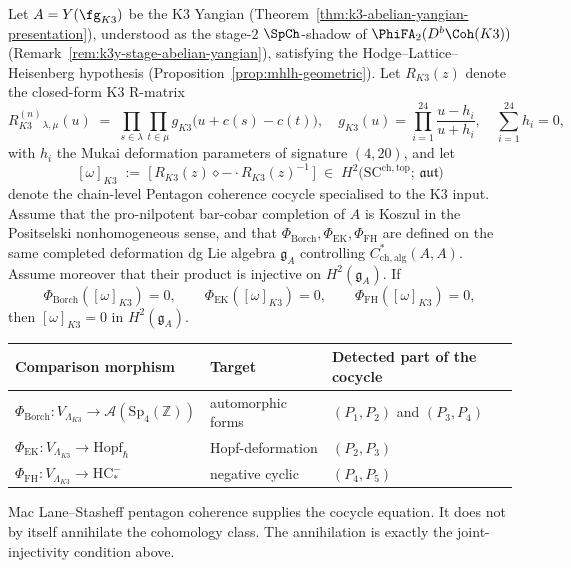\begin{theorem}
\label{thm:k3-pentagon-E1-edge-architecture}
Let $A = Y(\fg_{K3})$ be the K$3$ Yangian
\textup{(}Theorem~\ref{thm:k3-abelian-yangian-presentation}\textup{),}
understood as the stage-$2$ $\SpCh$-shadow of
$\PhiFA_2(D^b\Coh(K3))$ (Remark~\ref{rem:k3y-stage-abelian-yangian}),
satisfying the Hodge--Lattice--Heisenberg hypothesis
\textup{(}Proposition~\ref{prop:mhlh-geometric}\textup{).} Let
$R_{K3}(z)$ denote the closed-form K$3$ R-matrix
\[
 R_{K3}^{(n)}{}_{\lambda,\mu}(u)
 \;=\; \prod_{s \in \lambda}\prod_{t \in \mu}
 g_{K3}\bigl(u + c(s) - c(t)\bigr),
 \quad
 g_{K3}(u) = \prod_{i=1}^{24}\frac{u - h_i}{u + h_i},
 \quad \sum_{i=1}^{24} h_i = 0,
\]
with $h_i$ the Mukai deformation parameters of signature $(4, 20)$,
and let
\[
 [\omega]_{K3}
 \;:=\; \bigl[\, R_{K3}(z) \diamond - \cdot R_{K3}(z)^{-1}\,\bigr]
 \;\in\; H^2\bigl(\mathrm{SC}^{\mathrm{ch,top}};\, \mathfrak{aut}\bigr)
\]
denote the chain-level Pentagon coherence cocycle specialised to the
K$3$ input. Assume that the pro-nilpotent bar-cobar completion of
\(A\) is Koszul in the Positselski nonhomogeneous sense, and that
\(\Phi_{\mathrm{Borch}}, \Phi_{\mathrm{EK}}, \Phi_{\mathrm{FH}}\)
are defined on the same completed deformation dg Lie algebra
\(\mathfrak g_A\) controlling \(C^*_{\mathrm{ch,alg}}(A,A)\).
Assume moreover that their product is injective on \(H^2(\mathfrak g_A)\).
If
\[
 \Phi_{\mathrm{Borch}}([\omega]_{K3})=0,\qquad
 \Phi_{\mathrm{EK}}([\omega]_{K3})=0,\qquad
 \Phi_{\mathrm{FH}}([\omega]_{K3})=0,
\]
then \( [\omega]_{K3}=0\) in \(H^2(\mathfrak g_A)\).
\begin{center}
\begin{tabular}{lll}
\toprule
Comparison morphism & Target & Detected part of the cocycle \\
\midrule
$\Phi_{\mathrm{Borch}} : V_{\Lambda_{K3}} \to \mathcal{A}(\mathrm{Sp}_4(\mathbb{Z}))$
 & automorphic forms
 & $(P_1, P_2)$ and $(P_3, P_4)$ \\
$\Phi_{\mathrm{EK}} : V_{\Lambda_{K3}} \to \mathrm{Hopf}_{\hbar}$
 & Hopf-deformation
 & $(P_2, P_3)$ \\
$\Phi_{\mathrm{FH}} : V_{\Lambda_{K3}} \to \mathrm{HC}_*^-$
 & negative cyclic
 & $(P_4, P_5)$ \\
\bottomrule
\end{tabular}
\end{center}
Mac Lane--Stasheff pentagon coherence supplies the cocycle equation.
It does not by itself annihilate the cohomology class. The annihilation
is exactly the joint-injectivity condition above.
\end{theorem}

